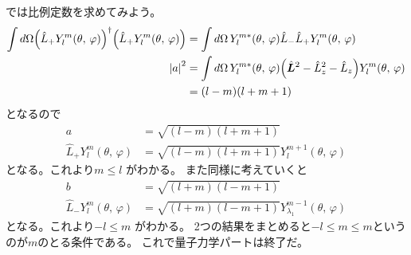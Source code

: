 \documentclass[../master.tex]{subfiles}
\begin{document}
では比例定数を求めてみよう。
\begin{equation}\begin{aligned}[b]
    \int d\Omega\qty(\hat{L}_+ Y_{l}^m(\theta,\,\varphi))^\dagger
	\qty(\hat{L}_+ Y_{l}^m(\theta,\,\varphi))
	          & = \int d\Omega\, Y_{l}^{m*}(\theta,\,\varphi)\hat{L}_-\hat{L}_+Y_{l}^m(\theta,\,\varphi)                           \\
	\abs{a}^2 & =\int d\Omega\, Y_{l}^{m*}(\theta,\,\varphi)\qty(\hat{\vb*{L}}^2 -\hat{L}_z^2 -\hat{L}_z)Y_{l}^m(\theta,\,\varphi) \\
	          & =(l-m)(l+m+1)
\end{aligned}\end{equation}
となるので
\begin{align}
	a                                & = \sqrt{(l-m)(l+m+1)}                            \\
	\hat{L}_+Y_l^m(\theta,\,\varphi) & = \sqrt{(l-m)(l+m+1)}Y_l^{m+1}(\theta,\,\varphi)
\end{align}
となる。これより\(m\leq l\) がわかる。
また同様に考えていくと
\begin{align}
	b                                & = \sqrt{(l+m)(l-m+1)}                                      \\
	\hat{L}_-Y_l^m(\theta,\,\varphi) & = \sqrt{(l+m)(l-m+1)}Y_{\lambda_1}^{m-1}(\theta,\,\varphi)
\end{align}
となる。これより\(-l\leq m\) がわかる。
2つの結果をまとめると\(-l \leq m \leq m\)というのが\(m\)のとる条件である。
これで量子力学パートは終了だ。
\end{document}
